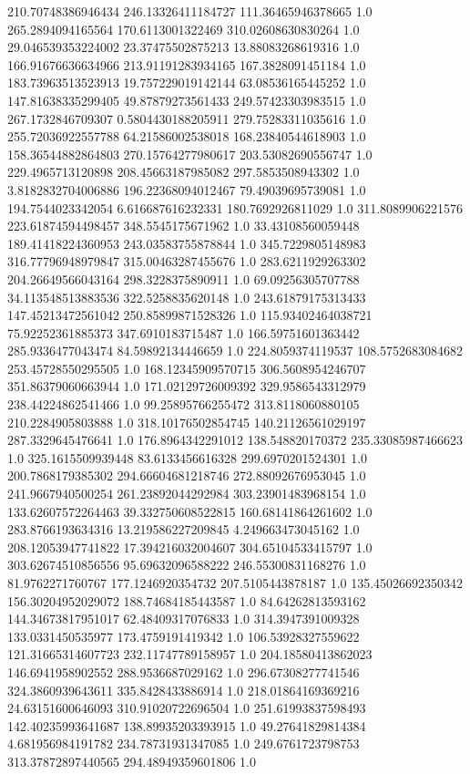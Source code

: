 210.70748386946434	246.13326411184727	111.36465946378665	1.0
265.2894094165564	170.6113001322469	310.02608630830264	1.0
29.046539353224002	23.37475502875213	13.88083268619316	1.0
166.91676636634966	213.91191283934165	167.3828091451184	1.0
183.73963513523913	19.757229019142144	63.08536165445252	1.0
147.81638335299405	49.87879273561433	249.57423303983515	1.0
267.1732846709307	0.5804430188205911	279.75283311035616	1.0
255.72036922557788	64.21586002538018	168.23840544618903	1.0
158.36544882864803	270.15764277980617	203.53082690556747	1.0
229.4965713120898	208.45663187985082	297.5853508943302	1.0
3.8182832704006886	196.22368094012467	79.49039695739081	1.0
194.7544023342054	6.616687616232331	180.7692926811029	1.0
311.8089906221576	223.61874594498457	348.5545175671962	1.0
33.43108560059448	189.41418224360953	243.03583755878844	1.0
345.7229805148983	316.77796948979847	315.00463287455676	1.0
283.6211929263302	204.26649566043164	298.3228375890911	1.0
69.09256305707788	34.113548513883536	322.5258835620148	1.0
243.61879175313433	147.45213472561042	250.85899871528326	1.0
115.93402464038721	75.92252361885373	347.6910183715487	1.0
166.59751601363442	285.9336477043474	84.59892134446659	1.0
224.8059374119537	108.5752683084682	253.45728550295505	1.0
168.12345909570715	306.5608954246707	351.86379060663944	1.0
171.02129726009392	329.9586543312979	238.44224862541466	1.0
99.25895766255472	313.8118060880105	210.2284905803888	1.0
318.10176502854745	140.21126561029197	287.3329645476641	1.0
176.8964342291012	138.548820170372	235.33085987466623	1.0
325.1615509939448	83.6133456616328	299.6970201524301	1.0
200.7868179385302	294.66604681218746	272.88092676953045	1.0
241.9667940500254	261.23892044292984	303.23901483968154	1.0
133.62607572264463	39.332750608522815	160.68141864261602	1.0
283.8766193634316	13.219586227209845	4.249663473045162	1.0
208.12053947741822	17.394216032004607	304.65104533415797	1.0
303.62674510856556	95.69632096588222	246.55300831168276	1.0
81.9762271760767	177.1246920354732	207.5105443878187	1.0
135.45026692350342	156.30204952029072	188.74684185443587	1.0
84.64262813593162	144.34673817951017	62.48409317076833	1.0
314.3947391009328	133.0331450535977	173.4759191419342	1.0
106.53928327559622	121.31665314607723	232.11747789158957	1.0
204.18580413862023	146.6941958902552	288.9536687029162	1.0
296.67308277741546	324.3860939643611	335.8428433886914	1.0
218.01864169369216	24.63151600646093	310.91020722696504	1.0
251.61993837598493	142.40235993641687	138.89935203393915	1.0
49.27641829814384	4.681956984191782	234.78731931347085	1.0
249.6761723798753	313.37872897440565	294.48949359601806	1.0
